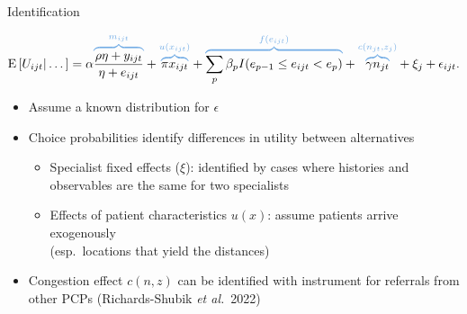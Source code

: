 \documentclass[slides, aspectratio=169]{beamer}
\newcommand{\bit}{\begin{itemize}}
\newcommand{\eit}{\end{itemize}}
\begin{document}
\begin{frame}[t]{Identification}

\vskip-24pt

\begin{equation*}
    \text{E} \left[ U_{ijt} | \dots \right] =
    \alpha {\color{spiritblue} \overbrace{\color{black} \frac{\rho \eta + y_{ijt}}{\eta + e_{ijt}} }^{m_{ijt}} }
    + {\color{spiritblue} \overbrace{ \color{black} \pi x_{ijt} }^{u(x_{ijt})} }
    + {\color{spiritblue} \overbrace{\color{black} \sum_{p}\beta_{p} I(e_{p-1}\leq e_{ijt} < e_{p}) }^{f(e_{ijt})} }
    + {\color{spiritblue} \overbrace{\color{black} \gamma n_{jt} }^{c(n_{jt}, z_j)} } + \xi_j + \epsilon_{ijt} .
\end{equation*}

\vskip-6pt

\begin{itemize}


\item Assume a known distribution for $\epsilon$
\bigskip

\item Choice probabilities identify differences in utility between alternatives
\bit
    \item Specialist fixed effects ($\xi$):
    identified by cases where histories and observables are the same for two specialists 
    \item Effects of patient characteristics $u(x)$: assume patients arrive exogenously \\
    (esp.~locations that yield the distances)
\eit
\bigskip \pause

\item Congestion effect $c(n, z)$ can be identified with instrument for referrals from other PCPs (Richards-Shubik \emph{et al.}~2022) 
\ \hyperlink{congestion}{}
\label{utility specification}

\end{itemize}

\end{frame}

\end{document}
